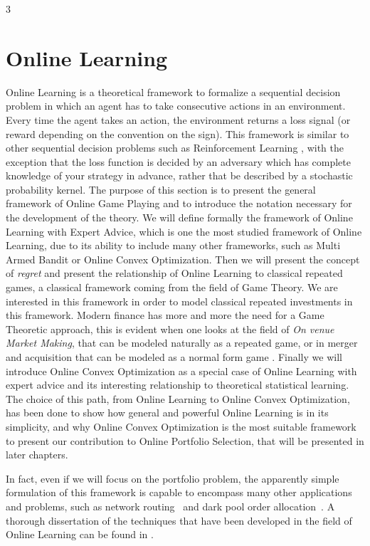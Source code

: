 3\chapter{Online Learning}\label{ch:OnlineLearning}
Online Learning is a theoretical framework to formalize a sequential decision problem in which an agent has to take consecutive actions in an environment. Every time the agent takes an action, the environment returns a loss signal (or reward depending on the convention on the sign). This framework is similar to other sequential decision problems such as Reinforcement Learning \cite{sutton1998introduction}, with the exception that the loss function is decided by an adversary which has complete knowledge of your strategy in advance, rather that be described by a stochastic probability kernel. 
The purpose of this section is to present the general framework of Online Game Playing and to introduce the notation necessary for the development of the theory. We will define formally the framework of Online Learning with Expert Advice, which is one the most studied framework of Online Learning, due to its ability to include many other frameworks, such as Multi Armed Bandit or Online Convex Optimization.
Then we will present the concept of \emph{regret} and present the relationship of Online Learning to classical repeated games, a classical framework coming from the field of Game Theory. 
We are interested in this framework in order to model classical repeated investments in this framework. 
Modern finance  has more and more the need for a Game Theoretic approach, this is evident when one looks at the field of \emph{On venue Market Making}, that can be modeled naturally as a repeated game, or in merger and acquisition that can be modeled as a normal form game \cite{Yanqing_MaA}. 
Finally we will introduce Online Convex Optimization as a special case of Online Learning with expert advice and its interesting relationship to theoretical statistical learning. The choice of this path, from Online Learning to Online Convex Optimization, has been done to show how general and powerful Online Learning is in its simplicity, and why Online Convex Optimization is the most suitable framework to present our contribution to Online Portfolio Selection, that will be presented in later chapters.

In fact, even if we will focus on the portfolio problem, the apparently simple formulation of this framework is capable to encompass many other applications and problems, such as network routing~\cite{belmega2018online} and dark pool order allocation~\cite{agarwal2010optimal}. 
A thorough dissertation of the techniques that have been developed in the field of Online Learning can be found in \cite{cesa2006prediction}.

